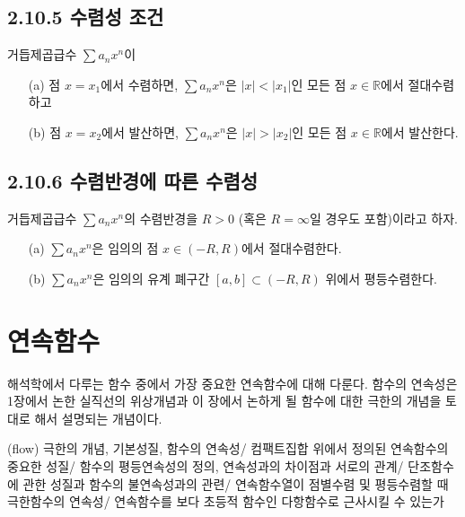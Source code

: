 \documentclass{article}
\begin{document}
\subsection*{\textmd{2.10.5 수렴성 조건}}

거듭제곱급수 $\sum a_n x^n$이 
\begin{itemize}
    \item[(a)] 점 $x = x_1$에서 수렴하면, $\sum a_n x^n$은 $|x| < |x_1|$인 모든 점 $x \in \mathbb{R}$에서 절대수렴하고
    \item[(b)] 점 $x = x_2$에서 발산하면, $\sum a_n x^n$은 $|x| > |x_2|$인 모든 점 $x \in \mathbb{R}$에서 발산한다.
\end{itemize}

\subsection*{\textmd{2.10.6 수렴반경에 따른 수렴성}}

거듭제곱급수 $\sum a_n x^n$의 수렴반경을 $R > 0$ (혹은 $R = \infty$일 경우도 포함)이라고 하자. 
\begin{itemize}
    \item[(a)] $\sum a_n x^n$은 임의의 점 $x \in (-R, R)$에서 절대수렴한다.
    \item[(b)] $\sum a_n x^n$은 임의의 유계 폐구간 $[a, b] \subset (-R, R)$ 위에서 평등수렴한다.
\end{itemize}



\setcounter{section}{2}

\section{연속함수}
해석학에서 다루는 함수 중에서 가장 중요한 연속함수에 대해 다룬다.
함수의 연속성은 1장에서 논한 실직선의 위상개념과 이 장에서 논하게 될 함수에 대한 극한의 개념을 토대로 해서 설명되는 개념이다.

(flow) 극한의 개념, 기본성질, 함수의 연속성/ 컴팩트집합 위에서 정의된 연속함수의 중요한 성질/ 함수의 평등연속성의 정의, 연속성과의 차이점과 서로의 관계/ 단조함수에 관한 성질과 함수의 불연속성과의 관련/ 연속함수열이 점별수렴 및 평등수렴할 때 극한함수의 연속성/ 연속함수를 보다 초등적 함수인 다항함수로 근사시킬 수 있는가


\subsection{\fontsize{11.5}{13}}
\end{document}
